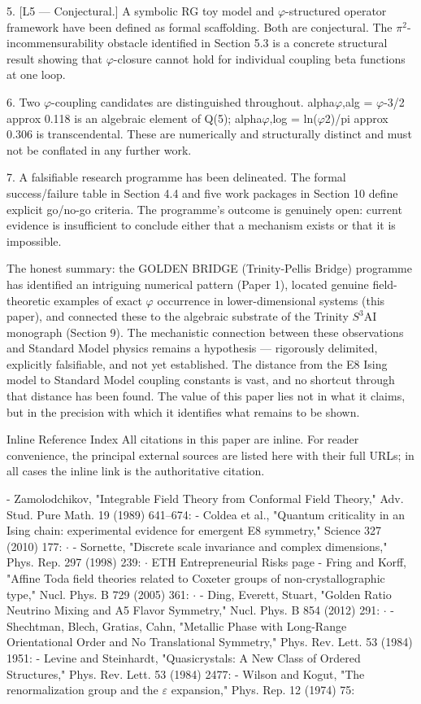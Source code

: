   5. [L5 --- Conjectural.] A symbolic RG toy model and $\varphi$-structured operator framework
  have   been    defined   as   formal     scaffolding.  Both    are   conjectural.   The
  $\pi^{2}$-incommensurability obstacle identified in Section 5.3 is a concrete structural result
  showing that $\varphi$-closure cannot hold for individual coupling beta functions at one loop.

  6. Two $\varphi$-coupling candidates are distinguished throughout. alpha$\varphi$,alg = $\varphi$-3/2 approx
  0.118 is an algebraic element of Q(5); alpha$\varphi$,log = ln($\varphi$2)/pi approx 0.306 is
  transcendental. These are numerically and structurally distinct and must not be
  conflated in any further work.

  7. A falsifiable research programme has been delineated. The formal success/failure
  table in Section 4.4 and five work packages in Section 10 define explicit go/no-go
  criteria. The programme's outcome is genuinely open: current evidence is insufficient
  to conclude either that a mechanism exists or that it is impossible.

  The honest summary: the GOLDEN BRIDGE (Trinity-Pellis Bridge) programme has identified an intriguing
  numerical pattern (Paper 1), located genuine field-theoretic examples of exact $\varphi$
  occurrence in lower-dimensional systems (this paper), and connected these to the
  algebraic substrate of the Trinity $S^{3}$AI monograph (Section 9). The mechanistic
  connection between these observations and Standard Model physics remains a
  hypothesis --- rigorously delimited, explicitly falsifiable, and not yet established. The
  distance from the E8 Ising model to Standard Model coupling constants is vast, and no
  shortcut through that distance has been found. The value of this paper lies not in what
  it claims, but in the precision with which it identifies what remains to be shown.

  Inline Reference Index
  All citations in this paper are inline. For reader convenience, the principal external
  sources are listed here with their full URLs; in all cases the inline link is the
  authoritative citation.

  - Zamolodchikov, "Integrable Field Theory from Conformal Field Theory," Adv. Stud.
  Pure Math. 19 (1989) 641--674:
  - Coldea et al., "Quantum criticality in an Ising chain: experimental evidence for
  emergent E8 symmetry," Science 327 (2010) 177:       $\cdot$
  - Sornette, "Discrete scale invariance and complex dimensions," Phys. Rep. 297 (1998)
  239:       $\cdot$ ETH Entrepreneurial Risks page
  - Fring and Korff, "Affine Toda field theories related to Coxeter groups of
  non-crystallographic type," Nucl. Phys. B 729 (2005) 361: $\cdot$
  - Ding, Everett, Stuart, "Golden Ratio Neutrino Mixing and A5 Flavor Symmetry," Nucl.
  Phys. B 854 (2012) 291:        $\cdot$
  - Shechtman, Blech, Gratias, Cahn, "Metallic Phase with Long-Range Orientational
  Order and No Translational Symmetry," Phys. Rev. Lett. 53 (1984) 1951:
  - Levine and Steinhardt, "Quasicrystals: A New Class of Ordered Structures," Phys. Rev.
  Lett. 53 (1984) 2477:
  - Wilson and Kogut, "The renormalization group and the $\varepsilon$ expansion," Phys. Rep. 12
  (1974) 75:

